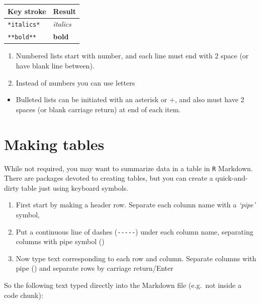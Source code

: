 \documentclass[
]{book}
\providecommand{\tightlist}{%
  \setlength{\itemsep}{0pt}\setlength{\parskip}{0pt}}
\begin{document}
\begin{longtable}[]{@{}ll@{}}
\toprule\noalign{}
Key stroke & Result \\
\midrule\noalign{}
\endhead
\bottomrule\noalign{}
\endlastfoot
\texttt{*italics*} & \emph{italics} \\
\texttt{**bold**} & \textbf{bold} \\
\end{longtable}

\begin{enumerate}
\def\labelenumi{\arabic{enumi}.}
\tightlist
\item
  Numbered lists start with number, and each line must end with 2 space (or have blank line between).
\item
  Instead of numbers you can use letters
\end{enumerate}

\begin{itemize}
\tightlist
\item
  Bulleted lists can be initiated with an asterisk or +, and also must have 2 spaces (or blank carriage return) at end of each item.
\end{itemize}

\hypertarget{making-tables}{%
\section{Making tables}\label{making-tables}}

While not required, you may want to summarize data in a table in \texttt{R} Markdown. There are packages devoted to creating tables, but you can create a quick-and-dirty table just using keyboard symbols.

\begin{enumerate}
\def\labelenumi{\arabic{enumi}.}
\tightlist
\item
  First start by making a header row. Separate each column name with a \emph{`pipe'} symbol, \texttt{\textbar{}}
\item
  Put a continuous line of dashes (\texttt{-\/-\/-\/-\/-}) under each column name, separating columns with pipe symbol (\texttt{\textbar{}})
\item
  Now type text corresponding to each row and column. Separate columns with pipe (\texttt{\textbar{}}) and separate rows by carriage return/Enter
\end{enumerate}

So the following text typed directly into the Markdown file (e.g.~not inside a code chunk):
\end{document}
